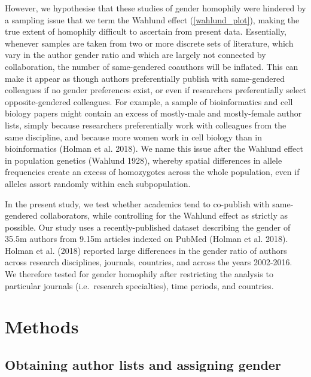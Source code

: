 \documentclass[12pt,]{article}
\begin{document}
However, we hypothesise that these studies of gender homophily were
hindered by a sampling issue that we term the Wahlund effect
(\autoref{wahlund_plot}), making the true extent of homophily difficult
to ascertain from present data. Essentially, whenever samples are taken
from two or more discrete sets of literature, which vary in the author
gender ratio and which are largely not connected by collaboration, the
number of same-gendered coauthors will be inflated. This can make it
appear as though authors preferentially publish with same-gendered
colleagues if no gender preferences exist, or even if researchers
preferentially select opposite-gendered colleagues. For example, a
sample of bioinformatics and cell biology papers might contain an excess
of mostly-male and mostly-female author lists, simply because
researchers preferentially work with colleagues from the same
discipline, and because more women work in cell biology than in
bioinformatics (Holman et al. 2018). We name this issue after the
Wahlund effect in population genetics (Wahlund 1928), whereby spatial
differences in allele frequencies create an excess of homozygotes across
the whole population, even if alleles assort randomly within each
subpopulation.

In the present study, we test whether academics tend to co-publish with
same-gendered collaborators, while controlling for the Wahlund effect as
strictly as possible. Our study uses a recently-published dataset
describing the gender of 35.5m authors from 9.15m articles indexed on
PubMed (Holman et al. 2018). Holman et al. (2018) reported large
differences in the gender ratio of authors across research disciplines,
journals, countries, and across the years 2002-2016. We therefore tested
for gender homophily after restricting the analysis to particular
journals (i.e.~research specialties), time periods, and countries.

\section{Methods}\label{methods}

\subsection{Obtaining author lists and assigning
gender}\label{obtaining-author-lists-and-assigning-gender}
\end{document}
